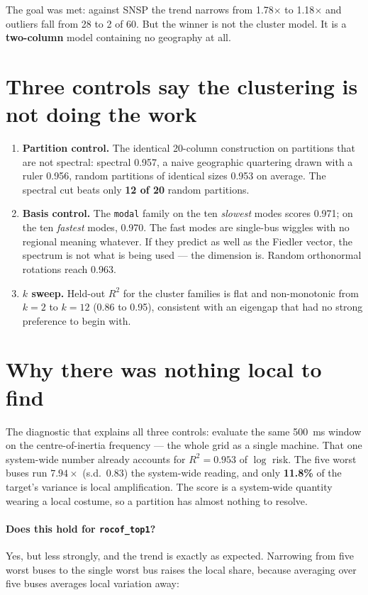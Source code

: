 \documentclass[11pt,a4paper]{article}
\newcommand{\Rtwo}{\ensuremath{R^{2}}}
\begin{document}
The goal was met: against SNSP the trend narrows from 1.78$\times$ to
1.18$\times$ and outliers fall from 28 to 2 of 60. But the winner is not the
cluster model. It is a \textbf{two-column} model containing no geography at
all.

\section{Three controls say the clustering is not doing the work}

\begin{enumerate}\itemsep2pt
\item \textbf{Partition control.} The identical 20-column construction on
partitions that are not spectral: spectral 0.957, a naive geographic
quartering drawn with a ruler 0.956, random partitions of identical sizes
0.953 on average. The spectral cut beats only \textbf{12 of 20} random
partitions.

\item \textbf{Basis control.} The \texttt{modal} family on the ten
\emph{slowest} modes scores 0.971; on the ten \emph{fastest} modes, 0.970.
The fast modes are single-bus wiggles with no regional meaning whatever. If
they predict as well as the Fiedler vector, the spectrum is not what is being
used --- the dimension is. Random orthonormal rotations reach 0.963.

\item \textbf{$k$ sweep.} Held-out \Rtwo{} for the cluster families is flat
and non-monotonic from $k=2$ to $k=12$ (0.86 to 0.95), consistent with an
eigengap that had no strong preference to begin with.
\end{enumerate}

\section{Why there was nothing local to find}

The diagnostic that explains all three controls: evaluate the same
\SI{500}{\milli\second} window on the centre-of-inertia frequency --- the
whole grid as a single machine. That one system-wide number already accounts
for $\Rtwo = 0.953$ of $\log$ risk. The five worst buses run
$7.94\times$ (s.d.\ 0.83) the system-wide reading, and only \textbf{11.8\%}
of the target's variance is local amplification. The score is a system-wide
quantity wearing a local costume, so a partition has almost nothing to
resolve.

\paragraph{Does this hold for \texttt{rocof\_top1}?} Yes, but less strongly,
and the trend is exactly as expected. Narrowing from five worst buses to the
single worst bus raises the local share, because averaging over five buses
averages local variation away:
\end{document}
